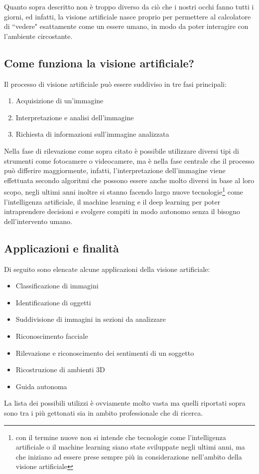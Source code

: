 \documentclass[12pt,a4paper,openright,twoside]{book}
\begin{document}
Quanto sopra descritto non è troppo diverso da ciò che i nostri occhi fanno tutti i giorni, ed infatti, la visione artificiale nasce proprio per permettere al calcolatore di ``vedere" esattamente come un essere umano, in modo da poter interagire con l'ambiente circostante.

\subsection{Come funziona la visione artificiale?}
Il processo di visione artificiale può essere suddiviso in tre fasi principali:
\begin{enumerate}
	\item Acquisizione di un'immagine
	\item Interpretazione e analisi dell'immagine
	\item Richiesta di informazioni sull'immagine analizzata
\end{enumerate}
Nella fase di rilevazione come sopra citato è possibile utilizzare diversi tipi di strumenti come fotocamere o videocamere, ma è nella fase centrale che il processo può differire maggiormente, infatti, l'interpretazione dell'immagine viene effettuata secondo algoritmi che possono essere anche molto diversi in base al loro scopo, negli ultimi anni inoltre si stanno facendo largo nuove tecnologie\footnote{con il termine nuove non si intende che tecnologie come l'intelligenza artificiale o il machine learning siano state sviluppate negli ultimi anni, ma che iniziano ad essere prese sempre più in considerazione nell'ambito della visione artificiale} come l'intelligenza artificiale, il machine learning e il deep learning per poter intraprendere decisioni e svolgere compiti in modo autonomo senza il bisogno dell'intervento umano.

\subsection{Applicazioni e finalità}
Di seguito sono elencate alcune applicazioni della visione artificiale:
\begin{itemize}
	\item Classificazione di immagini
	\item Identificazione di oggetti
	\item Suddivisione di immagini in sezioni da analizzare
	\item Riconoscimento facciale
	\item Rilevazione e riconoscimento dei sentimenti di un soggetto
	\item Ricostruzione di ambienti 3D
	\item Guida autonoma
\end{itemize}
La lista dei possibili utilizzi è ovviamente molto vasta ma quelli riportati sopra sono tra i più gettonati sia in ambito professionale che di ricerca.
\end{document}
